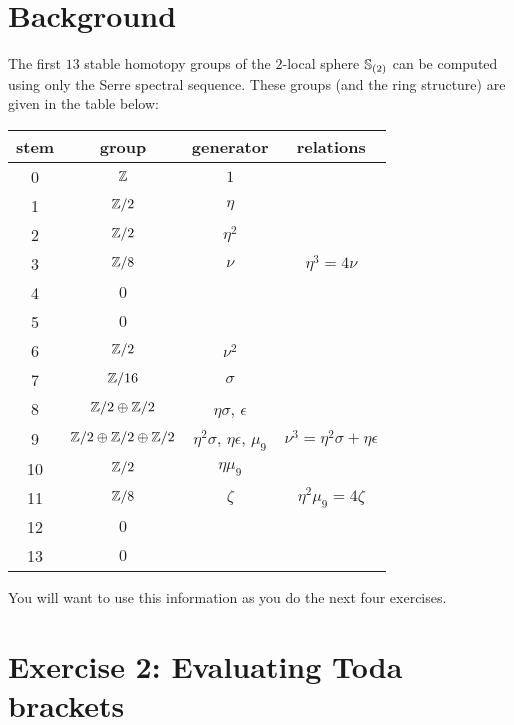 \documentclass[reqno]{amsart}
\begin{document}
\section*{\bf Background}

The first $13$ stable homotopy groups of the $2$-local sphere $\mathbb{S}_{(2)}$ can be computed using only the Serre spectral sequence. 
These groups (and the ring structure) are given in the table below:

\begin{center}
  \begin{tabular}{|c|c|c|c|}\hline
    stem & group & generator & relations \\\hline\hline
    0 & $\mathbb{Z}$ & $1$ & \\\hline
    1 & $\mathbb{Z}/2$ & $\eta$ & \\\hline
    2 & $\mathbb{Z}/2$ & $\eta^2$ & \\\hline
    3 & $\mathbb{Z}/8$ & $\nu$ & $\eta^3 = 4\nu$ \\\hline
    4 & $0$ & & \\\hline
    5 & $0$ & & \\\hline
    6 & $\mathbb{Z}/2$ & $\nu^2$ & \\\hline
    7 & $\mathbb{Z}/16$ & $\sigma$ & \\\hline
    8 & $\mathbb{Z}/2 \oplus \mathbb{Z}/2$ & $\eta\sigma$, $\epsilon$ & \\\hline
    9 & $\mathbb{Z}/2 \oplus \mathbb{Z}/2 \oplus \mathbb{Z}/2$ & $\eta^2\sigma$, $\eta\epsilon$, $\mu_9$ & $\nu^3 = \eta^2\sigma + \eta\epsilon$ \\\hline
    10 & $\mathbb{Z}/2$ & $\eta\mu_9$ & \\\hline
    11 & $\mathbb{Z}/8$ & $\zeta$ & $\eta^2\mu_9 = 4\zeta$ \\\hline
    12 & $0$ & & \\\hline
    13 & $0$& & \\\hline
  \end{tabular}
\end{center}

You will want to use this information as you do the next four exercises.

\section*{\bf Exercise 2: Evaluating Toda brackets}
\end{document}
